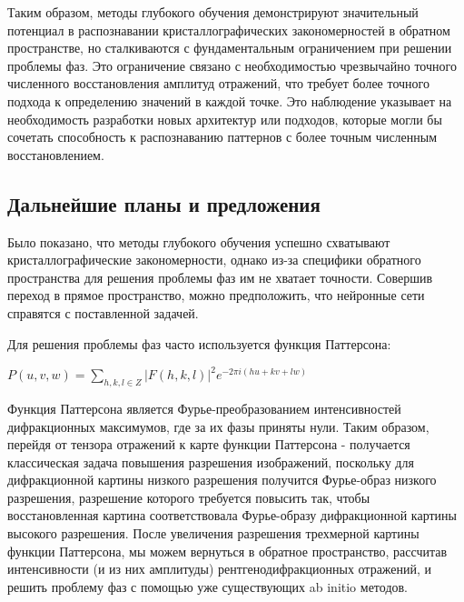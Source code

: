 Таким образом, методы глубокого обучения демонстрируют значительный потенциал в распознавании кристаллографических закономерностей в обратном пространстве, но сталкиваются с фундаментальным ограничением при решении проблемы фаз. Это ограничение связано с необходимостью чрезвычайно точного численного восстановления амплитуд отражений, что требует более точного подхода к определению значений в каждой точке. Это наблюдение указывает на необходимость разработки новых архитектур или подходов, которые могли бы сочетать способность к распознаванию паттернов с более точным численным восстановлением.

\subsection{Дальнейшие планы и предложения}

Было показано, что методы глубокого обучения успешно схватывают кристаллографические закономерности, однако из-за специфики обратного пространства для решения проблемы фаз им не хватает точности. Совершив переход в прямое пространство, можно предположить, что нейронные сети справятся с поставленной задачей.

Для решения проблемы фаз часто используется функция Паттерсона:

\begin{center}
    $P(u, v, w) = \sum\limits_{h,k,l\in Z} |F(h,k,l)|^2e^{-2\pi i(hu+kv+lw)}$
\end{center}

Функция Паттерсона является Фурье-преобразованием интенсивностей дифракционных максимумов, где за их фазы приняты нули. Таким образом, перейдя от тензора отражений к карте функции Паттерсона - получается классическая задача повышения разрешения изображений, поскольку для дифракционной картины низкого разрешения получится Фурье-образ низкого разрешения, разрешение которого требуется повысить так, чтобы восстановленная картина соответствовала Фурье-образу дифракционной картины высокого разрешения. После увеличения разрешения трехмерной картины функции Паттерсона, мы можем вернуться в обратное пространство, рассчитав интенсивности (и из них амплитуды) рентгенодифракционных отражений, и решить проблему фаз с помощью уже существующих ab initio методов.

